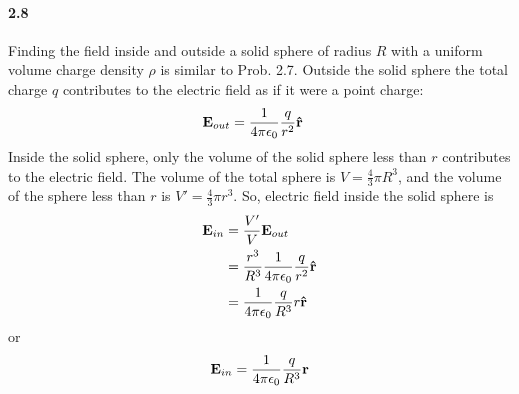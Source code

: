 \documentclass[../main.tex]{subfiles}
\begin{document}
\paragraph{2.8}\label{prob:2_8}
Finding the field inside and outside a solid sphere of radius $R$ with a uniform volume charge
density $\rho$ is similar to Prob. 2.7. Outside the solid sphere the total charge $q$ contributes
to the electric field as if it were a point charge:
\begin{align*}
    \vb{E}_{out} &= \frac{1}{4\pi\epsilon_0} \frac{q}{r^2} \vu{r}
\end{align*}
Inside the solid sphere, only the volume of the solid sphere less than $r$ contributes to the
electric field. The volume of the total sphere is $V = \frac{4}{3}\pi R^3$, and the volume of the
sphere less than $r$ is $V' = \frac{4}{3}\pi r^3$. So, electric field inside the solid sphere is
\begin{align*} 
    \vb{E}_{in} &= \frac{V'}{V} \vb{E}_{out} \\
    &= \frac{r^3}{R^3} \frac{1}{4\pi\epsilon_0} \frac{q}{r^2} \vu{r} \\
    &= \frac{1}{4\pi\epsilon_0} \frac{q}{R^3} r \vu{r} 
\end{align*}
or
\begin{align*}
    \vb{E}_{in} = \frac{1}{4\pi\epsilon_0} \frac{q}{R^3} \vb{r}
\end{align*}
\end{document}
